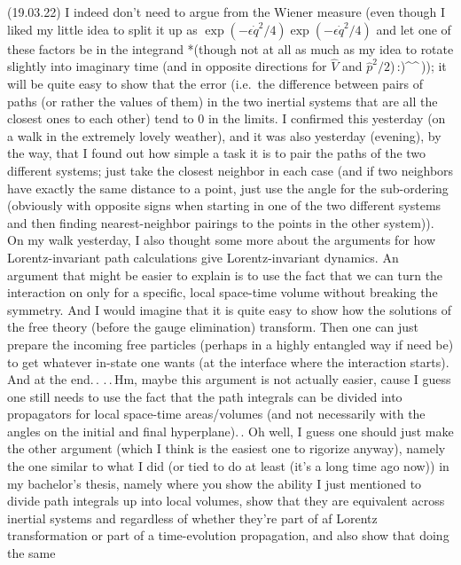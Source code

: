 \documentclass{report}
\begin{document}
(19.03.22) I indeed don't need to argue from the Wiener measure (even though I liked my little idea to split it up as $\exp(-\epsilon \dot q^2/4)\exp(-\epsilon \dot q^2/4)$ and let one of these factors be in the integrand *(though not at all as much as my idea to rotate slightly into imaginary time (and in opposite directions for $\hat V$ and $\hat p^2 / 2$)\,:)\textasciicircum\textasciicircum\,)); it will be quite easy to show that the error (i.e.\ the difference between pairs of paths (or rather the values of them) in the two inertial systems that are all the closest ones to each other) tend to 0 in the limits. I confirmed this yesterday (on a walk in the extremely lovely weather), and it was also yesterday (evening), by the way, that I found out how simple a task it is to pair the paths of the two different systems; just take the closest neighbor in each case (and if two neighbors have exactly the same distance to a point, just use the angle for the sub-ordering (obviously with opposite signs when starting in one of the two different systems and then finding nearest-neighbor pairings to the points in the other system)). On my walk yesterday, I also thought some more about the arguments for how Lorentz-invariant path calculations give Lorentz-invariant dynamics. An argument that might be easier to explain is to use the fact that we can turn the interaction on only for a specific, local space-time volume without breaking the symmetry. And I would imagine that it is quite easy to show how the solutions of the free theory (before the gauge elimination) transform. Then one can just prepare the incoming free particles (perhaps in a highly entangled way if need be) to get whatever in-state one wants (at the interface where the interaction starts). And at the end.\,. .\,.\,Hm, maybe this argument is not actually easier, cause I guess one still needs to use the fact that the path integrals can be divided into propagators for local space-time areas/volumes (and not necessarily with the angles on the initial and final hyperplane).\,. Oh well, I guess one should just make the other argument (which I think is the easiest one to rigorize anyway), namely the one similar to what I did (or tied to do at least (it's a long time ago now)) in my bachelor's thesis, namely where you show the ability I just mentioned to divide path integrals up into local volumes, show that they are equivalent across inertial systems and regardless of whether they're part of af Lorentz transformation or part of a time-evolution propagation, and also show that doing the same 
\end{document}
